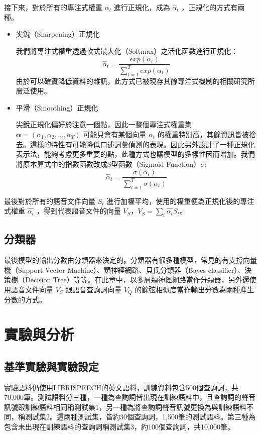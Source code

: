 接下來，對於所有的專注式權重 $\alpha_t$ 進行正規化，成為
$\hat{\alpha}_t$ ，正規化的方式有兩種。
\begin{itemize}
	\item{尖銳（Sharpening）正規化}
		
		我們將專注式權重透過軟式最大化（Softmax）之活化函數進行正規化：
		\begin{equation}
			\hat{\alpha}_t =
			\frac{exp(\alpha_t)}{\sum_{t=1}^{T} exp(\alpha_t)}
		\end{equation}
		由於可以確實降低資料的雜訊，此方式已被現存其餘專注式機制的相關研究所廣泛使用。
	\item{平滑（Smoothing）正規化}
		
		尖銳正規化偏好於注意一個點，因此一整個專注式權重集 $
		\boldsymbol{\alpha}
		= (\alpha_1,\alpha_2, ...,
		\alpha_T)$
		可能只會有某個向量 $\alpha_t$ 的權重特別高，其餘資訊皆被捨去。這樣的特性有可能降低口述詞彙偵測的表現。因此另外設計了一種正規化表示法，能夠考慮更多重要的點，此種方式也讓模型的多樣性因而增加。我們將原本算式中的指數函數改成S型函數（Sigmoid Function）$\sigma$:
		\begin{equation}
			\hat{\alpha}_t =
			\frac{\sigma(\alpha_t)}{\sum_{t=1}^{T}\sigma(\alpha_t)}
		\end{equation}

\end{itemize}

最後對於所有的語音文件向量 $S_t$
進行加權平均，使用的權重便為正規化後的專注式權重 $\hat{\alpha_t}$
，得到代表語音文件的向量 $V_S$，$V_S
= \sum_{t} \hat{\alpha_t} S_t$。
\label{ch4_doc_vec}
\subsection{分類器}
最後模型的輸出分數由分類器來決定的。分類器有很多種模型，常見的有支撐向量機（Support
Vector Machine）、類神經網路、貝氏分類器（Bayes
classifier）、決策樹（Decision
Tree）等等。在此章中，以多層類神經網路當作分類器，另外還使用語音文件向量 $V_S$
跟語音查詢詞向量 $V_Q$ 的餘弦相似度當作輸出分數為兩種產生分數的方式。
\label{ch4_classify}
\section{實驗與分析}
\subsection{基準實驗與實驗設定}
實驗語料仍使用LIBRISPEECH的英文語料，訓練資料包含500個查詢詞，共70,000筆。測試語料分三種，一種為查詢詞皆出現在訓練語料中，且查詢詞的聲音訊號跟訓練語料相同稱測試集$1$，另一種為將查詢詞聲音訊號更換為與訓練語料不同，稱測試集$2$。這兩種測試集，皆約30個查詢詞，1,500筆的測試語料。第三種為包含未出現在訓練語料的查詢詞稱測試集$3$，約100個查詢詞，共10,000筆。

